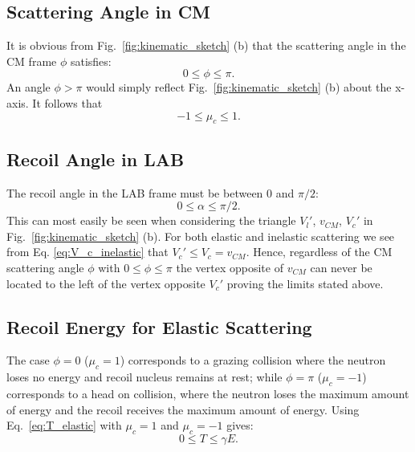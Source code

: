 \documentclass[review]{elsarticle}
\begin{document}
\subsection{Scattering Angle in CM}
It is obvious from Fig.~\ref{fig:kinematic_sketch} (b) that the scattering angle in the CM frame $\phi$ satisfies:
\begin{equation}
   0 \le \phi \le \pi.
\end{equation}
An angle $\phi > \pi$ would simply reflect Fig.~\ref{fig:kinematic_sketch} (b) about the x-axis. It follows that
\begin{equation}
   -1 \le \mu_c \le 1.
\end{equation}

\subsection{Recoil Angle in LAB}
The recoil angle in the  LAB frame must be between $0$ and $\pi/2$:
\begin{equation}
   0 \le \alpha \le \pi /2.
\end{equation}
This can most easily be seen when considering the triangle $V_l'$, $v_{CM}$, $V_c'$ in Fig.~\ref{fig:kinematic_sketch} (b). For both elastic and inelastic scattering we see from Eq. \ref{eq:V_c_inelastic} that
$V_c' \le V_c = v_{CM}$. Hence, regardless of the CM scattering angle $\phi$ with $0 \le \phi \le \pi$ the vertex opposite of $v_{CM}$ can never be located to the left of the vertex opposite $V_c'$ proving the 
limits stated above.  

\subsection{Recoil Energy for Elastic Scattering}
The case $\phi=0$ ($\mu_c=1$) corresponds to a grazing collision where the neutron loses no energy and recoil nucleus remains at rest; while $\phi=\pi$ ($\mu_c=-1$) corresponds to a head on collision,
where the neutron loses the maximum amount of energy and the recoil receives the maximum amount of energy. Using Eq.~\ref{eq:T_elastic} with $\mu_c=1$ and $\mu_c=-1$ gives:
\begin{equation}
    0 \le T \le \gamma E.
\end{equation}
\end{document}
